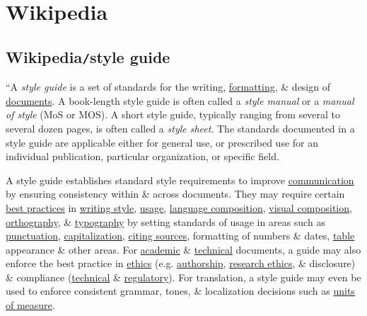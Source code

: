 \documentclass{article}
\begin{document}
\section{Wikipedia}

\subsection{Wikipedia{\tt/}style guide}
``A {\it style guide} is a set of standards for the writing, \href{https://en.wikipedia.org/wiki/Typesetting}{formatting}, \& design of \href{https://en.wikipedia.org/wiki/Document}{documents}. A book-length style guide is often called a {\it style manual} or a {\it manual of style} (MoS or MOS). A short style guide, typically ranging from several to several dozen pages, is often called a {\it style sheet}. The standards documented in a style guide are applicable either for general use, or prescribed use for an individual publication, particular organization, or specific field.

A style guide establishes standard style requirements to improve \href{https://en.wikipedia.org/wiki/Communication}{communication} by ensuring consistency within \& across documents. They may require certain \href{https://en.wikipedia.org/wiki/Best_practice}{best practices} in \href{https://en.wikipedia.org/wiki/Writing_style}{writing style}, \href{https://en.wikipedia.org/wiki/Usage_(language)}{usage}, \href{https://en.wikipedia.org/wiki/Composition_(language)}{language composition}, \href{https://en.wikipedia.org/wiki/Composition_(visual_arts)}{visual composition}, \href{https://en.wikipedia.org/wiki/Orthography}{orthography}, \& \href{https://en.wikipedia.org/wiki/Typography}{typography} by setting standards of usage in areas such as \href{https://en.wikipedia.org/wiki/Punctuation}{punctuation}, \href{https://en.wikipedia.org/wiki/Capitalization}{capitalization}, \href{https://en.wikipedia.org/wiki/Citation#Styles}{citing sources}, formatting of numbers \& dates, \href{https://en.wikipedia.org/wiki/Table_(information)}{table} appearance \& other areas. For \href{https://en.wikipedia.org/wiki/Academic_publishing}{academic} \& \href{https://en.wikipedia.org/wiki/Technical_communication}{technical} documents, a guide may also enforce the best practice in \href{https://en.wikipedia.org/wiki/Ethics}{ethics} (e.g. \href{https://en.wikipedia.org/wiki/Author}{authorship}, \href{https://en.wikipedia.org/wiki/Research_ethics}{research ethics}, \& disclosure) \& compliance (\href{https://en.wikipedia.org/wiki/Technical_standard}{technical} \& \href{https://en.wikipedia.org/wiki/Regulatory_compliance}{regulatory}). For translation, a style guide may even be used to enforce consistent grammar, tones, \& localization decisions such as \href{https://en.wikipedia.org/wiki/Unit_of_measurement}{units of measure}.
\end{document}
